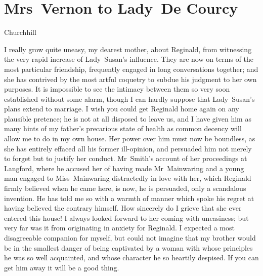\chapter{Mrs~Vernon to Lady~De Courcy}
  
  \begin{mail}{Churchhill}{}

I really grow quite uneasy, my dearest mother, about Reginald, from witnessing the very rapid increase of Lady~Susan's influence. They are now on terms of the most particular friendship, frequently engaged in long conversations together; and she has contrived by the most artful coquetry to subdue his judgment to her own purposes. It is impossible to see the intimacy between them so very soon established without some alarm, though I can hardly suppose that Lady~Susan's plans extend to marriage. I wish you could get Reginald home again on any plausible pretence; he is not at all disposed to leave us, and I have given him as many hints of my father's precarious state of health as common decency will allow me to do in my own house. Her power over him must now be boundless, as she has entirely effaced all his former ill-opinion, and persuaded him not merely to forget but to justify her conduct. Mr~Smith's account of her proceedings at Langford, where he accused her of having made Mr~Mainwaring and a young man engaged to Miss~Mainwaring distractedly in love with her, which Reginald firmly believed when he came here, is now, he is persuaded, only a scandalous invention. He has told me so with a warmth of manner which spoke his regret at having believed the contrary himself. How sincerely do I grieve that she ever entered this house! I always looked forward to her coming with uneasiness; but very far was it from originating in anxiety for Reginald. I expected a most disagreeable companion for myself, but could not imagine that my brother would be in the smallest danger of being captivated by a woman with whose principles he was so well acquainted, and whose character he so heartily despised. If you can get him away it will be a good thing. 

\end{mail}